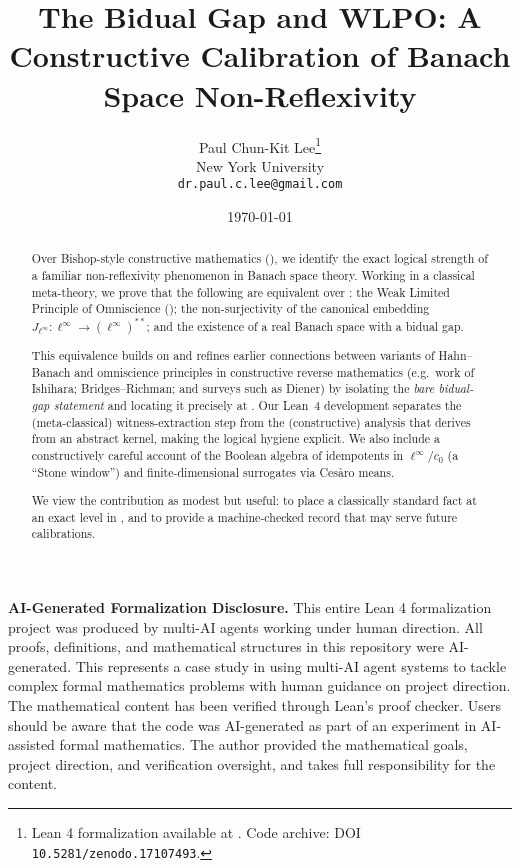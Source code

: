 \documentclass[11pt]{article}
\title{The Bidual Gap and WLPO: A Constructive Calibration of Banach Space Non-Reflexivity}
\author{Paul Chun-Kit Lee\thanks{Lean 4 formalization available at \leanRepo. Code archive: DOI \texttt{10.5281/zenodo.17107493}.} \\ 
New York University \\ 
\texttt{dr.paul.c.lee@gmail.com}}
\date{\today}
\newcommand{\WLPO}{\mathrm{WLPO}}
\newcommand{\BISH}{\mathrm{BISH}}
\newcommand{\CRM}{\mathrm{CRM}}
\begin{document}
\begin{abstract}
Over Bishop-style constructive mathematics (\BISH), we identify the exact logical strength of a familiar non-reflexivity phenomenon in Banach space theory. Working in a classical meta-theory, we prove that the following are equivalent over \BISH: the Weak Limited Principle of Omniscience (\WLPO); the non-surjectivity of the canonical embedding $J_{\ell^\infty}:\ell^\infty\to(\ell^\infty)^{**}$; and the existence of a real Banach space with a bidual gap. 

This equivalence builds on and refines earlier connections between variants of Hahn--Banach and omniscience principles in constructive reverse mathematics (e.g.\ work of Ishihara; Bridges--Richman; and surveys such as Diener) by isolating the \emph{bare bidual-gap statement} and locating it precisely at \WLPO. Our Lean~4 development separates the (meta-classical) witness-extraction step from the (constructive) analysis that derives \WLPO from an abstract kernel, making the logical hygiene explicit. We also include a constructively careful account of the Boolean algebra of idempotents in $\ell^\infty/c_0$ (a ``Stone window'') and finite-dimensional surrogates via Ces\`{a}ro means. 

We view the contribution as modest but useful: to place a classically standard fact at an exact level in \CRM, and to provide a machine-checked record that may serve future calibrations.
\end{abstract}

\maketitle

\begin{mdframed}[backgroundcolor=gray!08, linewidth=0.4pt]
\noindent\textbf{AI-Generated Formalization Disclosure.}
This entire Lean 4 formalization project was produced by multi-AI agents working under human direction. All proofs, definitions, and mathematical structures in this repository were AI-generated. This represents a case study in using multi-AI agent systems to tackle complex formal mathematics problems with human guidance on project direction. The mathematical content has been verified through Lean's proof checker. Users should be aware that the code was AI-generated as part of an experiment in AI-assisted formal mathematics. The author provided the mathematical goals, project direction, and verification oversight, and takes full responsibility for the content.
\end{mdframed}
\end{document}
